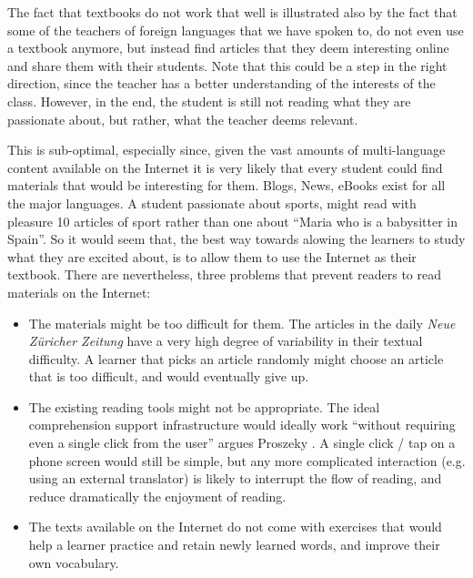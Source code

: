 

The fact that textbooks do not work that well is illustrated also by the fact that some of the teachers of foreign languages that we have spoken to, do not even use a textbook anymore, but instead find articles that they deem interesting online and share them with their students. Note that this could be a step in the right direction, since the teacher has a better understanding of the interests of the class. However, in the end, the student is still not reading what they are passionate about, but rather, what the teacher deems relevant. 

This is sub-optimal, especially since, given the vast amounts of multi-language content available on the Internet it is very likely that every student could find materials that would be interesting for them. Blogs, News, eBooks exist for all the major languages. A student passionate about sports, might read with pleasure 10 articles of sport rather than one about ``Maria who is a babysitter in Spain''. So it would seem that, the best way towards alowing the learners to study what they are excited about, is to allow them to use the Internet as their textbook. There are nevertheless, three problems that prevent readers to read materials on the Internet:

\begin{itemize}
	
  \item The materials might be too difficult for them. The articles in the  daily {\em Neue Z\"uricher Zeitung} have a very high degree of variability in their textual difficulty. A learner that picks an article randomly might choose an article that is too difficult, and would eventually give up. 

  \item The existing reading tools might not be appropriate. The ideal comprehension support infrastructure would ideally work ``without requiring even a single click from the user'' argues Proszeky \cite{Proszeky02-Comprehension}. A single click / tap on a phone screen would still be simple, but any more complicated interaction (e.g. using an external translator) is likely to interrupt the flow of reading, and reduce dramatically the enjoyment of reading. 
  
  \item The texts available on the Internet do not come with exercises that would help a learner practice and retain newly learned words, and improve their own vocabulary. 
  
\end{itemize}

